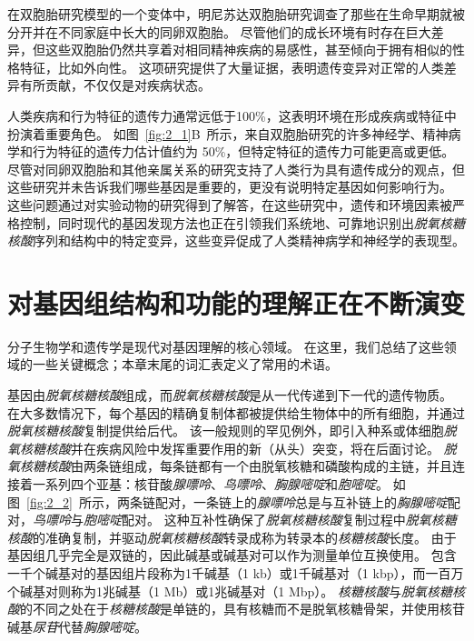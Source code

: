 在双胞胎研究模型的一个变体中，明尼苏达双胞胎研究调查了那些在生命早期就被分开并在不同家庭中长大的同卵双胞胎。
尽管他们的成长环境有时存在巨大差异，但这些双胞胎仍然共享着对相同精神疾病的易感性，甚至倾向于拥有相似的性格特征，比如外向性。
这项研究提供了大量证据，表明遗传变异对正常的人类差异有所贡献，不仅仅是对疾病状态。





人类疾病和行为特征的遗传力通常远低于100\%，这表明环境在形成疾病或特征中扮演着重要角色。
如图~\ref{fig:2_1}B~所示，来自双胞胎研究的许多神经学、精神病学和行为特征的遗传力估计值约为 50\%，但特定特征的遗传力可能更高或更低。
尽管对同卵双胞胎和其他亲属关系的研究支持了人类行为具有遗传成分的观点，但这些研究并未告诉我们哪些基因是重要的，更没有说明特定基因如何影响行为。
这些问题通过对实验动物的研究得到了解答，在这些研究中，遗传和环境因素被严格控制，同时现代的基因发现方法也正在引领我们系统地、可靠地识别出\textit{脱氧核糖核酸}序列和结构中的特定变异，这些变异促成了人类精神病学和神经学的表现型。



\section{对基因组结构和功能的理解正在不断演变}

分子生物学和遗传学是现代对基因理解的核心领域。
在这里，我们总结了这些领域的一些关键概念；本章末尾的词汇表定义了常用的术语。




基因由\textit{脱氧核糖核酸}组成，而\textit{脱氧核糖核酸}是从一代传递到下一代的遗传物质。
在大多数情况下，每个基因的精确复制体都被提供给生物体中的所有细胞，并通过\textit{脱氧核糖核酸}复制提供给后代。
该一般规则的罕见例外，即引入种系或体细胞\textit{脱氧核糖核酸}并在疾病风险中发挥重要作用的新（从头）突变，将在后面讨论。
\textit{脱氧核糖核酸}由两条链组成，每条链都有一个由脱氧核糖和磷酸构成的主链，并且连接着一系列四个亚基：核苷酸\textit{腺嘌呤}、\textit{鸟嘌呤}、\textit{胸腺嘧啶}和\textit{胞嘧啶}。
如图~\ref{fig:2_2}~所示，两条链配对，一条链上的\textit{腺嘌呤}总是与互补链上的\textit{胸腺嘧啶}配对，\textit{鸟嘌呤}与\textit{胞嘧啶}配对。
这种互补性确保了\textit{脱氧核糖核酸}复制过程中\textit{脱氧核糖核酸}的准确复制，并驱动\textit{脱氧核糖核酸}转录成称为转录本的\textit{核糖核酸}长度。
由于基因组几乎完全是双链的，因此碱基或碱基对可以作为测量单位互换使用。
包含一千个碱基对的基因组片段称为1千碱基（1 kb）或1千碱基对（1 kbp），而一百万个碱基对则称为1兆碱基（1 Mb）或1兆碱基对（1 Mbp）。
\textit{核糖核酸}与\textit{脱氧核糖核酸}的不同之处在于\textit{核糖核酸}是单链的，具有核糖而不是脱氧核糖骨架，并使用核苷碱基\textit{尿苷}代替\textit{胸腺嘧啶}。


